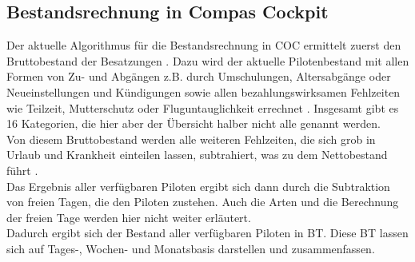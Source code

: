 \documentclass [12pt, a4paper, oneside, titlepage, ngerman]{article}
\begin{document}
\subsection{Bestandsrechnung in Compas Cockpit} \label{bestandsrechnung}
Der aktuelle Algorithmus für die Bestandsrechnung in \ac{COC} ermittelt zuerst den Bruttobestand der Besatzungen \cite[vgl.][S.8]{capfunc}. 
Dazu wird der aktuelle Pilotenbestand mit allen Formen von Zu- und Abgängen z.B. durch Umschulungen, Altersabgänge oder Neueinstellungen und Kündigungen sowie allen bezahlungswirksamen Fehlzeiten wie Teilzeit, Mutterschutz oder Fluguntauglichkeit errechnet \cite[vgl.][S.19]{benutzerhandbuch}. Insgesamt gibt es 16 Kategorien, die hier aber der Übersicht halber nicht alle genannt werden. \\
Von diesem Bruttobestand werden alle weiteren Fehlzeiten, die sich grob in Urlaub und Krankheit einteilen lassen, subtrahiert, was zu dem Nettobestand führt \cite[vgl.][S.8]{capfunc}. \\
Das Ergebnis aller verfügbaren Piloten ergibt sich dann durch die Subtraktion von freien Tagen, die den Piloten zustehen. Auch die Arten und die Berechnung der freien Tage werden hier nicht weiter erläutert. \\
Dadurch ergibt sich der Bestand aller verfügbaren Piloten in \ac{BT}. Diese \ac{BT} lassen sich auf Tages-, Wochen- und Monatsbasis darstellen und zusammenfassen. %
\end{document}
